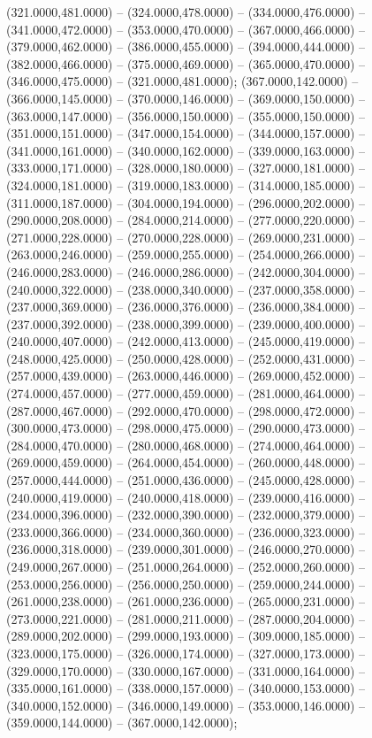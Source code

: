 \begin{scope}[draw=black,fill=cabdda4,line join=round,line width=0.208pt]
   (321.0000,481.0000) -- (324.0000,478.0000) --
    (334.0000,476.0000) -- (341.0000,472.0000) -- (353.0000,470.0000) --
    (367.0000,466.0000) -- (379.0000,462.0000) -- (386.0000,455.0000) --
    (394.0000,444.0000) -- (382.0000,466.0000) -- (375.0000,469.0000) --
    (365.0000,470.0000) -- (346.0000,475.0000) -- (321.0000,481.0000);
   (367.0000,142.0000) -- (366.0000,145.0000) --
    (370.0000,146.0000) -- (369.0000,150.0000) -- (363.0000,147.0000) --
    (356.0000,150.0000) -- (355.0000,150.0000) -- (351.0000,151.0000) --
    (347.0000,154.0000) -- (344.0000,157.0000) -- (341.0000,161.0000) --
    (340.0000,162.0000) -- (339.0000,163.0000) -- (333.0000,171.0000) --
    (328.0000,180.0000) -- (327.0000,181.0000) -- (324.0000,181.0000) --
    (319.0000,183.0000) -- (314.0000,185.0000) -- (311.0000,187.0000) --
    (304.0000,194.0000) -- (296.0000,202.0000) -- (290.0000,208.0000) --
    (284.0000,214.0000) -- (277.0000,220.0000) -- (271.0000,228.0000) --
    (270.0000,228.0000) -- (269.0000,231.0000) -- (263.0000,246.0000) --
    (259.0000,255.0000) -- (254.0000,266.0000) -- (246.0000,283.0000) --
    (246.0000,286.0000) -- (242.0000,304.0000) -- (240.0000,322.0000) --
    (238.0000,340.0000) -- (237.0000,358.0000) -- (237.0000,369.0000) --
    (236.0000,376.0000) -- (236.0000,384.0000) -- (237.0000,392.0000) --
    (238.0000,399.0000) -- (239.0000,400.0000) -- (240.0000,407.0000) --
    (242.0000,413.0000) -- (245.0000,419.0000) -- (248.0000,425.0000) --
    (250.0000,428.0000) -- (252.0000,431.0000) -- (257.0000,439.0000) --
    (263.0000,446.0000) -- (269.0000,452.0000) -- (274.0000,457.0000) --
    (277.0000,459.0000) -- (281.0000,464.0000) -- (287.0000,467.0000) --
    (292.0000,470.0000) -- (298.0000,472.0000) -- (300.0000,473.0000) --
    (298.0000,475.0000) -- (290.0000,473.0000) -- (284.0000,470.0000) --
    (280.0000,468.0000) -- (274.0000,464.0000) -- (269.0000,459.0000) --
    (264.0000,454.0000) -- (260.0000,448.0000) -- (257.0000,444.0000) --
    (251.0000,436.0000) -- (245.0000,428.0000) -- (240.0000,419.0000) --
    (240.0000,418.0000) -- (239.0000,416.0000) -- (234.0000,396.0000) --
    (232.0000,390.0000) -- (232.0000,379.0000) -- (233.0000,366.0000) --
    (234.0000,360.0000) -- (236.0000,323.0000) -- (236.0000,318.0000) --
    (239.0000,301.0000) -- (246.0000,270.0000) -- (249.0000,267.0000) --
    (251.0000,264.0000) -- (252.0000,260.0000) -- (253.0000,256.0000) --
    (256.0000,250.0000) -- (259.0000,244.0000) -- (261.0000,238.0000) --
    (261.0000,236.0000) -- (265.0000,231.0000) -- (273.0000,221.0000) --
    (281.0000,211.0000) -- (287.0000,204.0000) -- (289.0000,202.0000) --
    (299.0000,193.0000) -- (309.0000,185.0000) -- (323.0000,175.0000) --
    (326.0000,174.0000) -- (327.0000,173.0000) -- (329.0000,170.0000) --
    (330.0000,167.0000) -- (331.0000,164.0000) -- (335.0000,161.0000) --
    (338.0000,157.0000) -- (340.0000,153.0000) -- (340.0000,152.0000) --
    (346.0000,149.0000) -- (353.0000,146.0000) -- (359.0000,144.0000) --
    (367.0000,142.0000);
\end{scope}
